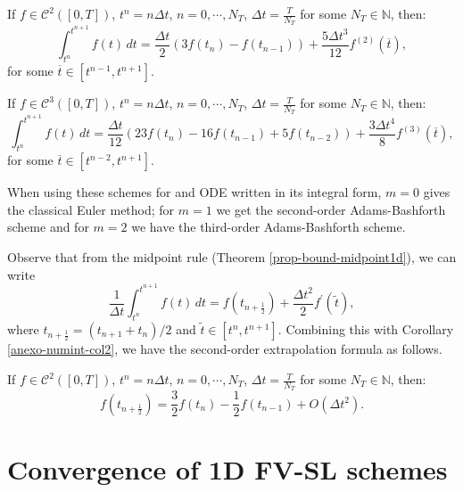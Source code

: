 \begin{corollary}
	\label{anexo-numint-col2}
	If $f\in \mathcal{C}^2([0,T])$, $t^n = n\Delta t$, $n=0, \cdots, N_T$, $\Delta t = \frac{T}{N_T}$ 
	for some $N_T \in \mathbb{N}$, then:
	\begin{equation}
		\int_{t^n}^{t^{n+1}} f(t)\,dt = \frac{\Delta t}{2} (3f(t_{n}) - f(t_{n-1}) )
		+ \frac{5\Delta t^{3}}{12} f^{(2)}(\overline{t}),
	\end{equation}
	for some $\overline{t} \in [t^{n-1}, t^{n+1}]$.
\end{corollary}

\begin{corollary}
	\label{anexo-numint-col3}
	If $f\in \mathcal{C}^3([0,T])$, $t^n = n\Delta t$, $n=0, \cdots, N_T$, $\Delta t = \frac{T}{N_T}$ 
	for some $N_T \in \mathbb{N}$, then:
	\begin{equation}
		\int_{t^n}^{t^{n+1}} f(t)\,dt = \frac{\Delta t}{12} (23f(t_{n}) - 16f(t_{n-1}) + 5f(t_{n-2}) )
		+ \frac{3\Delta t^{4}}{8} f^{(3)}(\overline{t}),
	\end{equation}
	for some $\overline{t} \in [t^{n-2}, t^{n+1}]$.
\end{corollary}

When using these schemes for and ODE written in its integral form,
$m=0$ gives the classical Euler method; for $m=1$ we get the second-order Adams-Bashforth scheme
and for $m=2$ we have the third-order Adams-Bashforth scheme.

Observe that from the midpoint rule (Theorem  \ref{prop-bound-midpoint1d}),
we can write
\begin{equation}
	\frac{1}{\Delta t}\int_{t^n}^{t^{n+1}} f(t)\,dt = f(t_{n+\frac{1}{2}})
	+ \frac{\Delta t^{2}}{2} f^{'}(\tilde{t}),
\end{equation}
where $t_{n+\frac{1}{2}} = (t_{n+1} + t_{n})/2$ and $\tilde{t} \in [t^n, t^{n+1}]$.
Combining this with Corollary \ref{anexo-numint-col2}, we have the second-order extrapolation formula as follows.
\begin{corollary}
	\label{anexo-numint-col4}
	If $f\in \mathcal{C}^2([0,T])$, $t^n = n\Delta t$, $n=0, \cdots, N_T$, $\Delta t = \frac{T}{N_T}$ 
	for some $N_T \in \mathbb{N}$, then:
	\begin{equation}
		f(t_{n+\frac{1}{2}}) = \frac{3}{2}f(t_{n}) - \frac{1}{2}f(t_{n-1}) + O(\Delta t^2).
	\end{equation}
\end{corollary}


\section{Convergence of 1D FV-SL schemes}
\label{convergence-1dfvsl}
